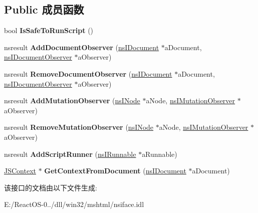 \subsection*{Public 成员函数}
\begin{DoxyCompactItemize}
\item 
\mbox{\label{interfacens_i_content_utils_a06cbe3bbd9240b2fbea19c692764700c}} 
bool {\bfseries Is\+Safe\+To\+Run\+Script} ()
\item 
\mbox{\label{interfacens_i_content_utils_a7f3a5457b88791829a94a4eb0b3f865c}} 
nsresult {\bfseries Add\+Document\+Observer} (\hyperlink{interfacens_i_document}{ns\+I\+Document} $\ast$a\+Document, \hyperlink{interfacens_i_document_observer}{ns\+I\+Document\+Observer} $\ast$a\+Observer)
\item 
\mbox{\label{interfacens_i_content_utils_a2d030f763c5c22128bd03ebbee0faf41}} 
nsresult {\bfseries Remove\+Document\+Observer} (\hyperlink{interfacens_i_document}{ns\+I\+Document} $\ast$a\+Document, \hyperlink{interfacens_i_document_observer}{ns\+I\+Document\+Observer} $\ast$a\+Observer)
\item 
\mbox{\label{interfacens_i_content_utils_aa116b94a4f1f5ed71b21095357683c96}} 
nsresult {\bfseries Add\+Mutation\+Observer} (\hyperlink{interfacens_i_supports}{ns\+I\+Node} $\ast$a\+Node, \hyperlink{interfacens_i_mutation_observer}{ns\+I\+Mutation\+Observer} $\ast$a\+Observer)
\item 
\mbox{\label{interfacens_i_content_utils_a99c26b52bd3dc6ebf89a22669a2faf45}} 
nsresult {\bfseries Remove\+Mutation\+Observer} (\hyperlink{interfacens_i_supports}{ns\+I\+Node} $\ast$a\+Node, \hyperlink{interfacens_i_mutation_observer}{ns\+I\+Mutation\+Observer} $\ast$a\+Observer)
\item 
\mbox{\label{interfacens_i_content_utils_a8505bd80cfaebb816929ea40524a8e40}} 
nsresult {\bfseries Add\+Script\+Runner} (\hyperlink{interfacens_i_runnable}{ns\+I\+Runnable} $\ast$a\+Runnable)
\item 
\mbox{\label{interfacens_i_content_utils_aa9648e535245e6944c8791de1ae55919}} 
\hyperlink{interfacevoid}{J\+S\+Context} $\ast$ {\bfseries Get\+Context\+From\+Document} (\hyperlink{interfacens_i_document}{ns\+I\+Document} $\ast$a\+Document)
\end{DoxyCompactItemize}


该接口的文档由以下文件生成\+:\begin{DoxyCompactItemize}
\item 
E\+:/\+React\+O\+S-\/0../dll/win32/mshtml/nsiface.\+idl\end{DoxyCompactItemize}
